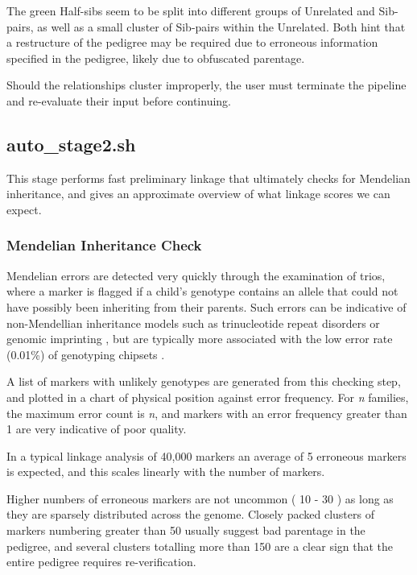 The green Half-sibs seem to be split into different groups of Unrelated and Sib-pairs, as well as a small cluster of Sib-pairs within the Unrelated. Both hint that a restructure of the pedigree may be required due to erroneous information specified in the pedigree, likely due to obfuscated parentage.

Should the relationships cluster improperly, the user must terminate the pipeline and re-evaluate their input before continuing.


\subsection{auto\_stage2.sh}

This stage performs fast preliminary linkage that ultimately checks for Mendelian inheritance, and gives an approximate overview of what linkage scores we can expect.

\subsubsection{Mendelian Inheritance Check}

Mendelian errors are detected very quickly through the examination of trios, where a marker is flagged if a child's genotype contains an allele that could not have possibly been inheriting from their parents. Such errors can be indicative of non-Mendellian inheritance models such as trinucleotide repeat disorders or genomic imprinting \cite{Walker2007218}, but are typically more associated with the low error rate (0.01\%) of genotyping chipsets \citep{saunders_estimating_2007}.

A list of markers with unlikely genotypes are generated from this checking step, and plotted in a chart of physical position against error frequency. For \textit{n} families, the maximum error count is \textit{n}, and markers with an error frequency greater than 1 are very indicative of poor quality.

In a typical linkage analysis of 40,000 markers an average of 5 erroneous markers is expected, and this scales linearly with the number of markers.

Higher numbers of erroneous markers are not uncommon ( 10 - 30 ) as long as they are sparsely distributed across the genome. Closely packed clusters of markers numbering greater than 50 usually suggest bad parentage in the pedigree, and several clusters totalling more than 150 are a clear sign that the entire pedigree requires re-verification.


